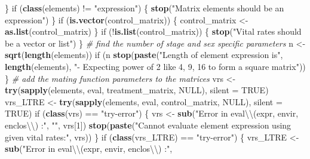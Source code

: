 \documentclass[]{article}
\newenvironment{Shaded}{\begin{snugshade}}{\end{snugshade}}
\newcommand{\KeywordTok}[1]{\textcolor[rgb]{0.13,0.29,0.53}{\textbf{{#1}}}}
\newcommand{\DataTypeTok}[1]{\textcolor[rgb]{0.13,0.29,0.53}{{#1}}}
\newcommand{\DecValTok}[1]{\textcolor[rgb]{0.00,0.00,0.81}{{#1}}}
\newcommand{\CharTok}[1]{\textcolor[rgb]{0.31,0.60,0.02}{{#1}}}
\newcommand{\StringTok}[1]{\textcolor[rgb]{0.31,0.60,0.02}{{#1}}}
\newcommand{\CommentTok}[1]{\textcolor[rgb]{0.56,0.35,0.01}{\textit{{#1}}}}
\newcommand{\OtherTok}[1]{\textcolor[rgb]{0.56,0.35,0.01}{{#1}}}
\newcommand{\NormalTok}[1]{{#1}}
\begin{document}
\begin{Shaded}
\begin{Highlighting}[]
{      \NormalTok{\}}
      \NormalTok{if (}\KeywordTok{class}\NormalTok{(elements) !=}\StringTok{ "expression"}\NormalTok{) \{}
        \KeywordTok{stop}\NormalTok{(}\StringTok{"Matrix elements should be an expression"}\NormalTok{)}
      \NormalTok{\}}
      \NormalTok{if (}\KeywordTok{is.vector}\NormalTok{(control_matrix)) \{}
        \NormalTok{control_matrix <-}\StringTok{ }\KeywordTok{as.list}\NormalTok{(control_matrix)}
      \NormalTok{\}}
      \NormalTok{if (!}\KeywordTok{is.list}\NormalTok{(control_matrix)) \{}
        \KeywordTok{stop}\NormalTok{(}\StringTok{"Vital rates should be a vector or list"}\NormalTok{)}
      \NormalTok{\}}
      \CommentTok{# find the number of stage and sex specific parameters}
      \NormalTok{n <-}\StringTok{ }\KeywordTok{sqrt}\NormalTok{(}\KeywordTok{length}\NormalTok{(elements))}
      \NormalTok{if (n%
        \KeywordTok{stop}\NormalTok{(}\KeywordTok{paste}\NormalTok{(}\StringTok{"Length of element expression is"}\NormalTok{, }\KeywordTok{length}\NormalTok{(elements), }
                   \StringTok{"- Expecting power of 2 like 4, 9, 16 to form a square matrix"}\NormalTok{))}
      \NormalTok{\}}
      \CommentTok{# add the mating function parameters to the matrices}
      \NormalTok{vrs <-}\StringTok{ }\KeywordTok{try}\NormalTok{(}\KeywordTok{sapply}\NormalTok{(elements, eval, treatment_matrix, }\OtherTok{NULL}\NormalTok{), }\DataTypeTok{silent =} \OtherTok{TRUE}\NormalTok{)}
      \NormalTok{vrs_LTRE <-}\StringTok{ }\KeywordTok{try}\NormalTok{(}\KeywordTok{sapply}\NormalTok{(elements, eval, control_matrix, }\OtherTok{NULL}\NormalTok{), }\DataTypeTok{silent =} \OtherTok{TRUE}\NormalTok{)}
      \NormalTok{if (}\KeywordTok{class}\NormalTok{(vrs) ==}\StringTok{ "try-error"}\NormalTok{) \{}
        \NormalTok{vrs <-}\StringTok{ }\KeywordTok{sub}\NormalTok{(}\StringTok{"Error in eval}\CharTok{\textbackslash{}\textbackslash{}}\StringTok{(expr, envir, enclos}\CharTok{\textbackslash{}\textbackslash{}}\StringTok{) :"}\NormalTok{,}
                   \StringTok{""}\NormalTok{, vrs[}\DecValTok{1}\NormalTok{])}
        \KeywordTok{stop}\NormalTok{(}\KeywordTok{paste}\NormalTok{(}\StringTok{"Cannot evaluate element expression using given vital rates:"}\NormalTok{,}
                   \NormalTok{vrs))}
      \NormalTok{\}}
      \NormalTok{if (}\KeywordTok{class}\NormalTok{(vrs_LTRE) ==}\StringTok{ "try-error"}\NormalTok{) \{}
        \NormalTok{vrs_LTRE <-}\StringTok{ }\KeywordTok{sub}\NormalTok{(}\StringTok{"Error in eval}\CharTok{\textbackslash{}\textbackslash{}}\StringTok{(expr, envir, enclos}\CharTok{\textbackslash{}\textbackslash{}}\StringTok{) :"}\NormalTok{,}
}}
\end{Highlighting}
\end{Shaded}
\end{document}

